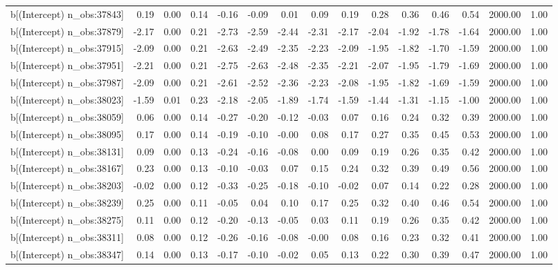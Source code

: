 \begin{table}[ht]
\begin{tabular}{rrrrrrrrrrrrrrr}
  b[(Intercept) n\_obs:37843] & 0.19 & 0.00 & 0.14 & -0.16 & -0.09 & 0.01 & 0.09 & 0.19 & 0.28 & 0.36 & 0.46 & 0.54 & 2000.00 & 1.00 \\ 
  b[(Intercept) n\_obs:37879] & -2.17 & 0.00 & 0.21 & -2.73 & -2.59 & -2.44 & -2.31 & -2.17 & -2.04 & -1.92 & -1.78 & -1.64 & 2000.00 & 1.00 \\ 
  b[(Intercept) n\_obs:37915] & -2.09 & 0.00 & 0.21 & -2.63 & -2.49 & -2.35 & -2.23 & -2.09 & -1.95 & -1.82 & -1.70 & -1.59 & 2000.00 & 1.00 \\ 
  b[(Intercept) n\_obs:37951] & -2.21 & 0.00 & 0.21 & -2.75 & -2.63 & -2.48 & -2.35 & -2.21 & -2.07 & -1.95 & -1.79 & -1.69 & 2000.00 & 1.00 \\ 
  b[(Intercept) n\_obs:37987] & -2.09 & 0.00 & 0.21 & -2.61 & -2.52 & -2.36 & -2.23 & -2.08 & -1.95 & -1.82 & -1.69 & -1.59 & 2000.00 & 1.00 \\ 
  b[(Intercept) n\_obs:38023] & -1.59 & 0.01 & 0.23 & -2.18 & -2.05 & -1.89 & -1.74 & -1.59 & -1.44 & -1.31 & -1.15 & -1.00 & 2000.00 & 1.00 \\ 
  b[(Intercept) n\_obs:38059] & 0.06 & 0.00 & 0.14 & -0.27 & -0.20 & -0.12 & -0.03 & 0.07 & 0.16 & 0.24 & 0.32 & 0.39 & 2000.00 & 1.00 \\ 
  b[(Intercept) n\_obs:38095] & 0.17 & 0.00 & 0.14 & -0.19 & -0.10 & -0.00 & 0.08 & 0.17 & 0.27 & 0.35 & 0.45 & 0.53 & 2000.00 & 1.00 \\ 
  b[(Intercept) n\_obs:38131] & 0.09 & 0.00 & 0.13 & -0.24 & -0.16 & -0.08 & 0.00 & 0.09 & 0.19 & 0.26 & 0.35 & 0.42 & 2000.00 & 1.00 \\ 
  b[(Intercept) n\_obs:38167] & 0.23 & 0.00 & 0.13 & -0.10 & -0.03 & 0.07 & 0.15 & 0.24 & 0.32 & 0.39 & 0.49 & 0.56 & 2000.00 & 1.00 \\ 
  b[(Intercept) n\_obs:38203] & -0.02 & 0.00 & 0.12 & -0.33 & -0.25 & -0.18 & -0.10 & -0.02 & 0.07 & 0.14 & 0.22 & 0.28 & 2000.00 & 1.00 \\ 
  b[(Intercept) n\_obs:38239] & 0.25 & 0.00 & 0.11 & -0.05 & 0.04 & 0.10 & 0.17 & 0.25 & 0.32 & 0.40 & 0.46 & 0.54 & 2000.00 & 1.00 \\ 
  b[(Intercept) n\_obs:38275] & 0.11 & 0.00 & 0.12 & -0.20 & -0.13 & -0.05 & 0.03 & 0.11 & 0.19 & 0.26 & 0.35 & 0.42 & 2000.00 & 1.00 \\ 
  b[(Intercept) n\_obs:38311] & 0.08 & 0.00 & 0.12 & -0.26 & -0.16 & -0.08 & -0.00 & 0.08 & 0.16 & 0.23 & 0.32 & 0.41 & 2000.00 & 1.00 \\ 
  b[(Intercept) n\_obs:38347] & 0.14 & 0.00 & 0.13 & -0.17 & -0.10 & -0.02 & 0.05 & 0.13 & 0.22 & 0.30 & 0.39 & 0.47 & 2000.00 & 1.00 \\ 

\end{tabular}
\end{table}
